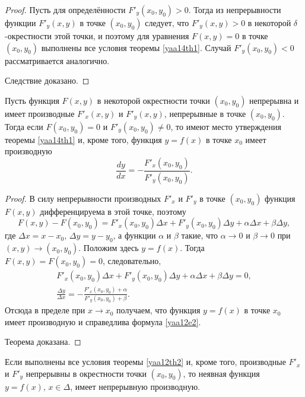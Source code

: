 \begin{proof}
Пусть для определённости $F'_y(x_0,y_0)>0$. Тогда из непрерывности функции $F'_y(x,y)$ в точке $(x_0,y_0)$ следует, что $F'_y(x,y)>0$ в некоторой $\delta$-окрестности этой точки, и поэтому для уравнения $F(x,y)=0$ в точке $(x_0,y_0)$ выполнены все условия теоремы \ref{yaa14th1}. Случай $F'_y(x_0,y_0)<0$ рассматривается аналогично.

Следствие доказано.
\end{proof}

\begin{thm} \label{yaa12th2}
Пусть функция $F(x,y)$ в некоторой окрестности точки $(x_0,y_0)$ непрерывна и имеет производные $F'_x(x,y)$ и $F'_y(x,y)$, непрерывные в точке $(x_0,y_0)$. Тогда если $F(x_0,y_0)=0$ и $F'_y(x_0,y_0)\ne 0$, то имеют место утверждения теоремы \ref{yaa14th1} и, кроме того, функция $y=f(x)$ в точке $x_0$ имеет производную
\begin{equation}\label{yaa12e2}
\frac{dy}{dx} = -\frac{F'_x(x_0,y_0)}{F'_y(x_0,y_0)}.
\end{equation}
\end{thm}

\begin{proof}
В силу непрерывности производных $F'_x$ и $F'_y$ в точке $(x_0,y_0)$ функция $F(x,y)$ дифференцируема в этой точке, поэтому
$$
F(x,y)-F(x_0,y_0)=F'_x(x_0,y_0)\Delta x+F'_y(x_0,y_0)\Delta y+\alpha\Delta x+\beta\Delta y,
$$
где $\Delta x=x-x_0,\, \Delta y = y-y_0$, а функции $\alpha$ и $\beta$ такие, что $\alpha\to 0$ и $\beta \to 0$ при $(x,y)\to (x_0,y_0)$. Положим здесь $y=f(x)$. Тогда $F(x,y) = F(x_0,y_0)=0$, следовательно,
\begin{gather*}
F'_x(x_0,y_0)\Delta x+F'_y(x_0,y_0)\Delta y + \alpha\Delta x+\beta\Delta y=0,\\
\frac{\Delta y}{\Delta x} = -\frac{F'_x(x_0,y_0)+\alpha}{F'_y(x_0,y_0)+\beta}.
\end{gather*}
Отсюда в пределе при $x \to x_0$ получаем, что функция $y=f(x)$ в точке $x_0$ имеет производную и справедлива формула \eqref{yaa12e2}.

Теорема доказана.
\end{proof}

\begin{cons}\label{yaa12c2}
Если выполнены все условия теоремы \ref{yaa12th2} и, кроме того, производные $F'_x$ и $F'_y$ непрерывны в окрестности точки $(x_0,y_0)$, то неявная функция $y=f(x),\,x\in\Delta$, имеет непрерывную производную.
\end{cons}

